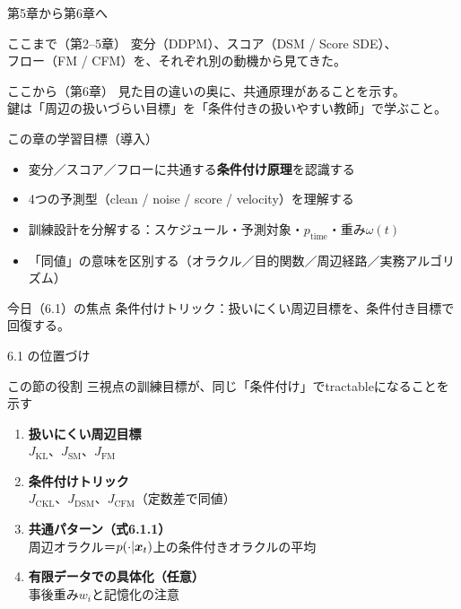 

\begin{frame}{第5章から第6章へ}
    \begin{block}{ここまで（第2--5章）}
        変分（DDPM）、スコア（DSM / Score SDE）、\\
        フロー（FM / CFM）を、それぞれ別の動機から見てきた。
    \end{block}
    \begin{block}{ここから（第6章）}
        見た目の違いの奥に、共通原理があることを示す。\\
        鍵は「周辺の扱いづらい目標」を「条件付きの扱いやすい教師」で学ぶこと。
    \end{block}
\end{frame}
\asmain
\begin{frame}{この章の学習目標（導入）}
    \begin{itemize}
        \item 変分／スコア／フローに共通する\textbf{条件付け原理}を認識する
        \item 4つの予測型（clean / noise / score / velocity）を理解する
        \item 訓練設計を分解する：スケジュール・予測対象・$p_{\mathrm{time}}$・重み$\omega(t)$
        \item 「同値」の意味を区別する（オラクル／目的関数／周辺経路／実務アルゴリズム）
    \end{itemize}
    \begin{block}{今日（6.1）の焦点}
        条件付けトリック：扱いにくい周辺目標を、条件付き目標で回復する。
    \end{block}
\end{frame}
\asmain
\begin{frame}{6.1 の位置づけ}
    \begin{block}{この節の役割}
        三視点の訓練目標が、同じ「条件付け」でtractableになることを示す
    \end{block}
    \begin{enumerate}
        \item \textbf{扱いにくい周辺目標}\\
        $J_{\mathrm{KL}}$、$J_{\mathrm{SM}}$、$J_{\mathrm{FM}}$
        \item \textbf{条件付けトリック}\\
        $J_{\mathrm{CKL}}$、$J_{\mathrm{DSM}}$、$J_{\mathrm{CFM}}$（定数差で同値）
        \item \textbf{共通パターン（式6.1.1）}\\
        周辺オラクル＝$p(\cdot|\bm{x}_t)$上の条件付きオラクルの平均
        \item \textbf{有限データでの具体化（任意）}\\
        事後重み$w_i$と記憶化の注意
    \end{enumerate}
\end{frame}
